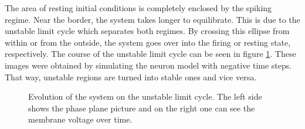 \documentclass[12pt,a4paper]{article}
\begin{document}
The area of resting initial conditions is completely enclosed by the spiking regime. Near the border, the system takes longer to equilibrate. This is due to the unstable limit cycle which separates both regimes. By crossing this ellipse from within or from the outside, the system goes over into the firing or resting state, respectively. The course of the unstable limit cycle can be seen in figure \ref{unstable}. These images were obtained by simulating the neuron model with negative time steps. That way, unstable regions are turned into stable ones and vice versa. 
\begin{figure}[H]
	\caption{Evolution of the system on the unstable limit cycle. The left side shows the phase plane picture and on the right one can see the membrane voltage over time.}
	\label{unstable} 
\end{figure}
\end{document}

